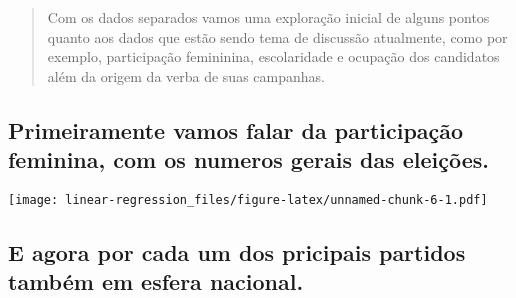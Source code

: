 \documentclass[]{article}
\newenvironment{Shaded}{\begin{snugshade}}{\end{snugshade}}
\newcommand{\KeywordTok}[1]{\textcolor[rgb]{0.13,0.29,0.53}{\textbf{#1}}}
\newcommand{\DataTypeTok}[1]{\textcolor[rgb]{0.13,0.29,0.53}{#1}}
\newcommand{\StringTok}[1]{\textcolor[rgb]{0.31,0.60,0.02}{#1}}
\newcommand{\OperatorTok}[1]{\textcolor[rgb]{0.81,0.36,0.00}{\textbf{#1}}}
\newcommand{\NormalTok}[1]{#1}
\begin{document}
\begin{quote}
Com os dados separados vamos uma exploração inicial de alguns pontos
quanto aos dados que estão sendo tema de discussão atualmente, como por
exemplo, participação femininina, escolaridade e ocupação dos candidatos
além da origem da verba de suas campanhas.
\end{quote}

\subsection{Primeiramente vamos falar da participação feminina, com os
numeros gerais das
eleições.}\label{primeiramente-vamos-falar-da-participacao-feminina-com-os-numeros-gerais-das-eleicoes.}

\begin{Shaded}
\end{Shaded}

\texttt{[image: linear-regression\_files/figure-latex/unnamed-chunk-6-1.pdf]}

\subsection{E agora por cada um dos pricipais partidos também em esfera
nacional.}\label{e-agora-por-cada-um-dos-pricipais-partidos-tambem-em-esfera-nacional.}
\end{document}
